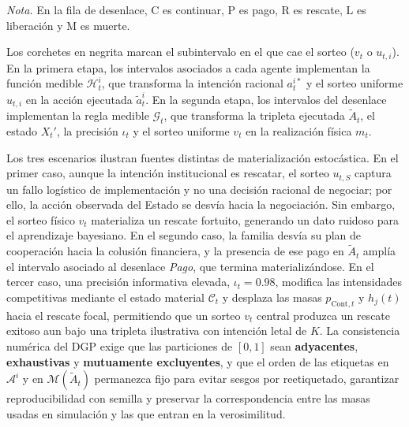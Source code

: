 \documentclass[12pt]{article}
\theoremstyle{definition}
\theoremstyle{remark}
\newcommand{\1}{\mathbf{1}}
\begin{document}
  \begin{minipage}[t]{0.95\linewidth}\footnotesize\raggedright
  \textit{Nota.} En la fila de desenlace, $\mathrm{C}$ es continuar, $\mathrm{P}$ es pago, $\mathrm{R}$ es rescate, $\mathrm{L}$ es liberación y $\mathrm{M}$ es muerte.\par\smallskip
  \noindent Los corchetes en negrita marcan el subintervalo en el que cae el sorteo \textup{(}$v_t$ o $u_{t,i}$\textup{)}. En la primera etapa, los intervalos asociados a cada agente implementan la función medible $\mathcal{H}_t^i$, que transforma la intención racional $a_t^{i\ast}$ y el sorteo uniforme $u_{t,i}$ en la acción ejecutada $\tilde{a}_t^i$. En la segunda etapa, los intervalos del desenlace implementan la regla medible $\mathcal{G}_t$, que transforma la tripleta ejecutada $\tilde{A}_t$, el estado $X_t'$, la precisión $\iota_t$ y el sorteo uniforme $v_t$ en la realización física $m_t$.
  \end{minipage}
\endgroup

\vspace{0.85\baselineskip}

\noindent Los tres escenarios ilustran fuentes distintas de materialización estocástica. En el primer caso, aunque la intención institucional es rescatar, el sorteo $u_{t,S}$ captura un fallo logístico de implementación y no una decisión racional de negociar; por ello, la acción observada del Estado se desvía hacia la negociación. Sin embargo, el sorteo físico $v_t$ materializa un rescate fortuito, generando un dato ruidoso para el aprendizaje bayesiano. En el segundo caso, la familia desvía su plan de cooperación hacia la colusión financiera, y la presencia de ese pago en $\tilde{A}_t$ amplía el intervalo asociado al desenlace \emph{Pago}, que termina materializándose. En el tercer caso, una precisión informativa elevada, $\iota_t=0.98$, modifica las intensidades competitivas mediante el estado material $\mathcal C_t$ y desplaza las masas $p_{\mathrm{Cont},t}$ y $h_j(t)$ hacia el rescate focal, permitiendo que un sorteo $v_t$ central produzca un rescate exitoso aun bajo una tripleta ilustrativa con intención letal de $K$. La consistencia numérica del DGP exige que las particiones de $[0,1]$ sean \textbf{adyacentes}, \textbf{exhaustivas} y \textbf{mutuamente excluyentes}, y que el orden de las etiquetas en $\mathcal{A}^i$ y en $\mathcal{M}(\tilde{A}_t)$ permanezca fijo para evitar sesgos por reetiquetado, garantizar reproducibilidad con semilla y preservar la correspondencia entre las masas usadas en simulación y las que entran en la verosimilitud.
\end{document}
